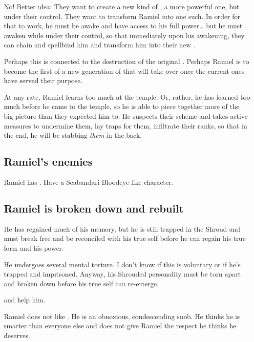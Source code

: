 No! Better idea: They want to create a new kind of \Sephirah, a more powerful one, but under their control. They want to transform Ramiel into one such. In order for that to work, he must be awake and have access to his full \sathariah{} power\ldots{} but he must awaken while under their control, so that immediately upon his awakening, they can chain and spellbind him and transform him into their new \Sephirah. 

Perhaps this is connected to the destruction of the original \Sephiroth. Perhaps Ramiel is to become the first of a new generation of \Sephiroth{} that will take over once the current ones have served their purpose. 

At any rate, Ramiel learns too much at the temple. Or, rather, he has learned too much before he came to the temple, so he is able to piece together more of the big picture than they expected him to. He suspects their scheme and takes active measures to undermine them, lay traps for them, infiltrate their ranks, so that in the end, he will be stabbing \emph{them} in the back. 







\subsection{Ramiel's enemies}
Ramiel has . 
Have a Scabandari Bloodeye-like character. 







\subsection{Ramiel is broken down and rebuilt}
He has regained much of his memory, but he is still trapped in the Shroud and must break free and be reconciled with his true self before he can regain his true \resphan{} form and his \sathariah{} power. 

He undergoes several mental torture. I don't know if this is voluntary or if he's trapped and imprisoned. Anyway, his Shrouded personality must be torn apart and broken down before his true self can re-emerge. 

\Cishiel{} and \Gilchad{} help him. 

Ramiel does not like \Gilchad. 
He is an obnoxious, condescending snob. 
He thinks he is smarter than everyone else and does not give Ramiel the respect he thinks he deserves. 

